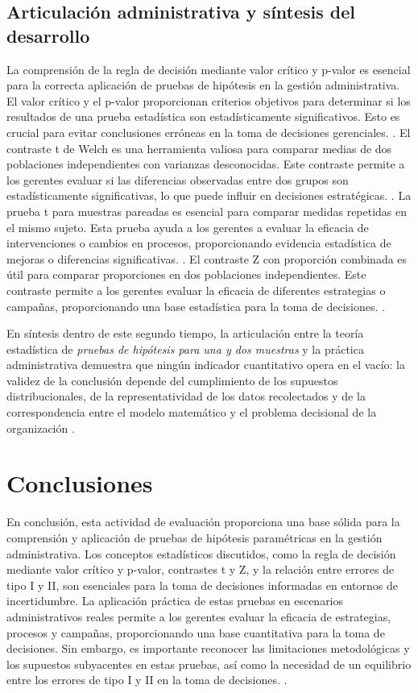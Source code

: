 {\subsection{Articulación administrativa y síntesis del desarrollo}
La comprensión de la regla de decisión mediante valor crítico y p-valor es esencial para la correcta aplicación de pruebas de hipótesis en la gestión administrativa. El valor crítico y el p-valor proporcionan criterios objetivos para determinar si los resultados de una prueba estadística son estadísticamente significativos. Esto es crucial para evitar conclusiones erróneas en la toma de decisiones gerenciales. \citep{holmesBusiness2023,nistHandbook}.
El contraste t de Welch es una herramienta valiosa para comparar medias de dos poblaciones independientes con varianzas desconocidas. Este contraste permite a los gerentes evaluar si las diferencias observadas entre dos grupos son estadísticamente significativas, lo que puede influir en decisiones estratégicas. \citep{holmesBusiness2023,nistHandbook}.
La prueba t para muestras pareadas es esencial para comparar medidas repetidas en el mismo sujeto. Esta prueba ayuda a los gerentes a evaluar la eficacia de intervenciones o cambios en procesos, proporcionando evidencia estadística de mejoras o diferencias significativas. \citep{holmesBusiness2023,nistHandbook}.
El contraste Z con proporción combinada es útil para comparar proporciones en dos poblaciones independientes. Este contraste permite a los gerentes evaluar la eficacia de diferentes estrategias o campañas, proporcionando una base estadística para la toma de decisiones. \citep{holmesBusiness2023,nistHandbook}.

En síntesis dentro de este segundo tiempo, la articulación entre la teoría estadística de \textit{pruebas de hipótesis para una y dos muestras} y la práctica administrativa demuestra que ningún indicador cuantitativo opera en el vacío: la validez de la conclusión depende del cumplimiento de los supuestos distribucionales, de la representatividad de los datos recolectados y de la correspondencia entre el modelo matemático y el problema decisional de la organización \citep{anderson2012,nistHandbook,guarin2002}.

\clearpage
\section{Conclusiones}
En conclusión, esta actividad de evaluación proporciona una base sólida para la comprensión y aplicación de pruebas de hipótesis paramétricas en la gestión administrativa. Los conceptos estadísticos discutidos, como la regla de decisión mediante valor crítico y p-valor, contrastes t y Z, y la relación entre errores de tipo I y II, son esenciales para la toma de decisiones informadas en entornos de incertidumbre. La aplicación práctica de estas pruebas en escenarios administrativos reales permite a los gerentes evaluar la eficacia de estrategias, procesos y campañas, proporcionando una base cuantitativa para la toma de decisiones. Sin embargo, es importante reconocer las limitaciones metodológicas y los supuestos subyacentes en estas pruebas, así como la necesidad de un equilibrio entre los errores de tipo I y II en la toma de decisiones. \citep{anderson2012,lind2012,wackerly2010,diazRodriguez2022}.
}

